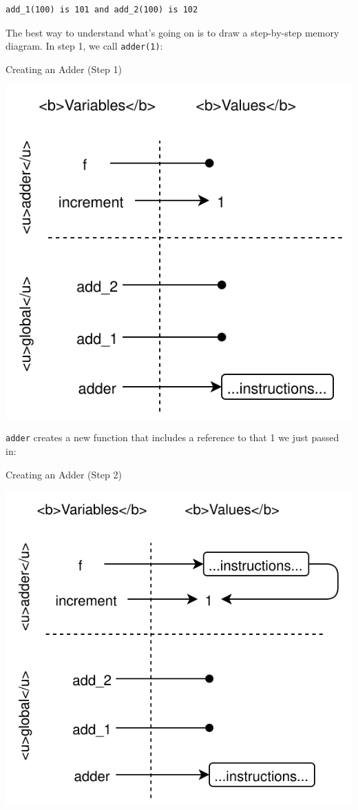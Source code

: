 \begin{verbatim}
add_1(100) is 101 and add_2(100) is 102
\end{verbatim}

The best way to understand what's going on is to draw a step-by-step
memory diagram. In step 1, we call \texttt{adder(1)}:

Creating an Adder (Step 1)

\includegraphics{../../files/callbacks-adder-1.svg}

\texttt{adder} creates a new function that includes a reference to that
1 we just passed in:

Creating an Adder (Step 2)

\includegraphics{../../files/callbacks-adder-2.svg}

